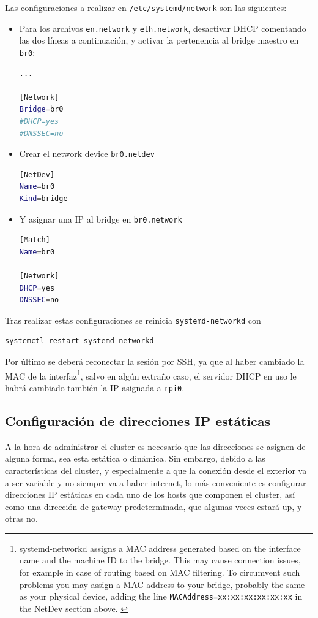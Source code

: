 Las configuraciones a realizar en \texttt{/etc/systemd/network} son las siguientes:

\begin{itemize}
    \item Para los archivos \texttt{en.network} y \texttt{eth.network}, desactivar DHCP comentando las dos líneas a continuación, y activar la pertenencia al bridge maestro en \texttt{br0}:
\begin{lstlisting}[language=bash]
...

[Network]
Bridge=br0
#DHCP=yes
#DNSSEC=no
\end{lstlisting}
    \item Crear el network device \texttt{br0.netdev}
\begin{lstlisting}[language=bash]
[NetDev]
Name=br0
Kind=bridge
\end{lstlisting}
    \item Y asignar una IP al bridge en \texttt{br0.network}
\begin{lstlisting}[language=bash]
[Match]
Name=br0

[Network]
DHCP=yes
DNSSEC=no
\end{lstlisting}
\end{itemize}

Tras realizar estas configuraciones se reinicia \texttt{systemd-networkd} con
\begin{lstlisting}[language=bash]
systemctl restart systemd-networkd
\end{lstlisting}

Por último se deberá reconectar la sesión por SSH, ya que al haber cambiado la MAC de la interfaz\footnote{systemd-networkd assigns a MAC address generated based on the interface name and the machine ID to the bridge. This may cause connection issues, for example in case of routing based on MAC filtering. To circumvent such problems you may assign a MAC address to your bridge, probably the same as your physical device, adding the line \texttt{MACAddress=xx:xx:xx:xx:xx:xx} in the NetDev section above. \cite{archwiki_systemd-networkd}}, salvo en algún extraño caso, el servidor DHCP en uso le habrá cambiado también la IP asignada a \texttt{rpi0}.

\subsection{Configuración de direcciones IP estáticas}
\label{ssec:configuracion_ip_estaticas}
A la hora de administrar el cluster es necesario que las direcciones se asignen de alguna forma, sea esta estática o dinámica. Sin embargo, debido a las características del cluster, y especialmente a que la conexión desde el exterior va a ser variable y no siempre va a haber internet, lo más conveniente es configurar direcciones IP estáticas en cada uno de los hosts que componen el cluster, así como una dirección de gateway predeterminada, que algunas veces estará up, y otras no.

